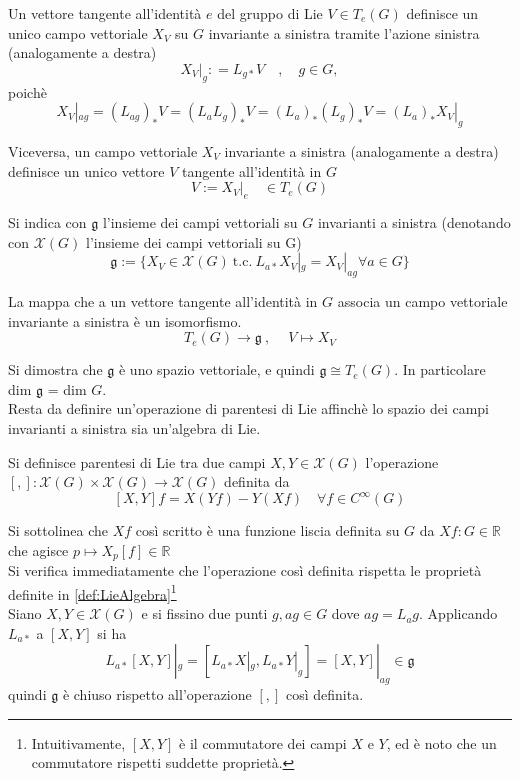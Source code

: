 Un vettore tangente all'identità $e$ del gruppo di Lie $V \in T_e(G)$
definisce un unico campo vettoriale $X_V$ su $G$ invariante a sinistra tramite
l'azione sinistra (analogamente a destra)
$$
   X_V|_g : = L_{g*} V \quad , \quad g \in G,
$$
poichè
$$
   X_V|_{ag} = (L_{ag})_* V = (L_a L_g)_* V = (L_a)_*(L_g)_* V = (L_a)_* X_V|_g
$$

Viceversa, un campo vettoriale $X_V$ invariante a sinistra (analogamente a destra)
definisce un unico vettore $V$ tangente all'identità in $G$
$$
   V := X_V|_e \quad \in T_e(G)
$$
\begin{definition}\label{def:GroupLieLlgebra}
  Si indica con $\mathfrak{g}$ l'insieme dei campi vettoriali su $G$ invarianti
  a sinistra (denotando con $\mathcal{X}(G)$ l'insieme dei campi vettoriali su G)
  $$
    \mathfrak{g} := \{ X_V \in \mathcal{X}(G) \mathrm{\: t.c. \:}
       L_{a*}X_V|_g = X_V|_{ag} \forall a \in G \}
  $$
\end{definition}
La mappa che a un vettore tangente all'identità in $G$ associa un campo vettoriale
invariante a sinistra è un isomorfismo.
$$
   T_e(G) \to \mathfrak{g} \:,\: \quad V \mapsto X_V
$$

Si dimostra che $\mathfrak{g}$ è uno spazio vettoriale, e quindi $\mathfrak{g} \cong T_e(G)$.
In particolare dim $\mathfrak{g}$ = dim $G$.\\

Resta da definire un'operazione di parentesi di Lie affinchè lo spazio dei campi
invarianti a sinistra sia un'algebra di Lie.\\
\begin{definition}\label{def:parentesiLie}
   Si definisce parentesi di Lie tra due campi $X,Y \in \mathcal{X}(G)$ l'operazione
   $[,] : \mathcal{X}(G) \times \mathcal{X}(G) \to \mathcal{X}(G)$ definita da
   $$
      [X,Y]f = X(Yf) - Y(Xf) \quad \forall f \in C^\infty(G)
   $$
\end{definition}
Si sottolinea che $Xf$ così scritto è una funzione liscia definita su $G$ da
$Xf : G \in \mathbb{R}$ che agisce $p \mapsto X_p[f]\in \mathbb{R}$\\

Si verifica immediatamente che l'operazione così definita rispetta le proprietà
definite in \ref{def:LieAlgebra}\footnote{Intuitivamente, $[X,Y]$ è il commutatore
dei campi $X$ e $Y$, ed è noto che un commutatore rispetti suddette proprietà.}\\

Siano $X,Y \in \mathcal{X}(G)$ e si fissino due punti $g, ag \in G$ dove
$ag = L_a g$. Applicando $L_{a*}$ a $[X,Y]$ si ha
$$
   L_{a*}[X,Y]|_g = [L_{a*}X|_g,L_{a*}Y|_g] = [X,Y]|_{ag} \in \mathfrak{g}
$$
quindi $\mathfrak{g}$ è chiuso rispetto all'operazione $[,]$ così definita.\\

